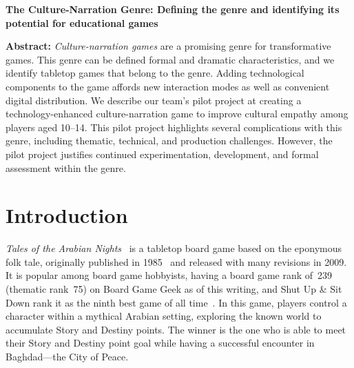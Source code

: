 \documentclass[a4paper]{article}
\newcommand{\projecttitle}{The Culture-Narration Genre: Defining the genre and identifying its potential for educational games}
\begin{document}
\begin{center}
\fontsize{14}{16.8}\selectfont
\bf \projecttitle
\end{center}

\vspace{-0.25in}
\begin{center}
\iftoggle{blind}{
}{
Paul Gestwicki, Kaley Rittichier, and Austin DeArmond, Ball State University\\
pvgestwicki@bsu.edu, kjrittichier@bsu.edu, ajdearmond@bsu.edu\\
}
\end{center}

\newcommand{\totan}{\textit{TotAN}}
\newcommand{\smersh}{\textit{SMERSH}}
\newcommand{\figwidth}{2.5in}

%
\begin{adjustwidth}{0.5in}{0.5in}
  \textbf{Abstract:}  \textit{Culture-narration games} are a promising
  genre for transformative games. This genre can be defined formal and
  dramatic characteristics, and we identify tabletop games that belong
  to the genre.  Adding technological components to the game affords
  new interaction modes as well as convenient digital distribution. We
  describe our team's pilot project at creating a technology-enhanced
  culture-narration game to improve cultural empathy among players aged
  10--14.  This pilot project highlights several complications with
  this genre, including thematic, technical, and production
  challenges.  However, the pilot project justifies continued
  experimentation, development, and formal assessment within the
  genre.
\end{adjustwidth}

\section{Introduction}


\textit{Tales of the Arabian Nights}~\citep{Goldberg2009} is a 
tabletop board game based on the eponymous folk tale,
originally published in 1985~\citep{Goldberg1985} and
released with many revisions in 2009.
It is popular among board game hobbyists, having a board game
rank of~239 (thematic rank~75) on Board Game Geek as of this writing,
and Shut Up \& Sit Down rank it as the ninth best game of all 
time~\citep{ShutUp2015}.
In this game, players control a character within a mythical Arabian
setting, exploring the known world to accumulate Story and
Destiny points. The winner is the one who is able to meet their 
Story and Destiny point goal while having a successful encounter
in Baghdad---the City of Peace. 
\end{document}
